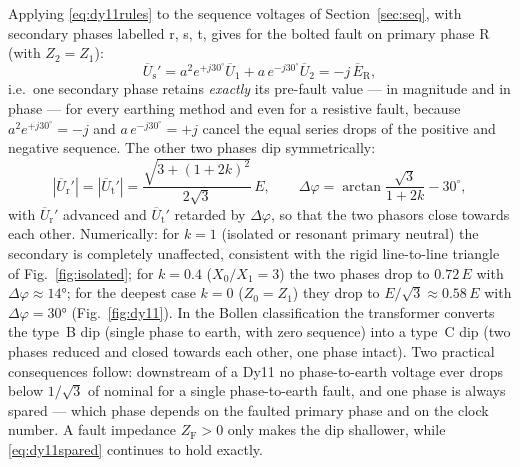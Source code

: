 \documentclass[a4paper,11pt]{article}
\newcommand{\ph}[1]{\mathrm{#1}}
\newcommand{\pE}[1]{\overline{E}_{\ph{#1}}}
\newcommand{\pU}[1]{\overline{U}_{\ph{#1}}}
\begin{document}
Applying \eqref{eq:dy11rules} to the sequence voltages of
Section~\ref{sec:seq}, with secondary phases labelled r, s, t, gives for the
bolted fault on primary phase R (with $Z_{2}=Z_{1}$):
\begin{equation}
\pU{s}' = a^{2}e^{+j30^{\circ}}\overline{U}_{1}
        + a\,e^{-j30^{\circ}}\overline{U}_{2}
        = -j\,\pE{R},
\label{eq:dy11spared}
\end{equation}
i.e.\ one secondary phase retains \emph{exactly} its pre-fault value --- in
magnitude and in phase --- for every earthing method and even for a resistive
fault, because $a^{2}e^{+j30^{\circ}} = -j$ and $a\,e^{-j30^{\circ}} = +j$
cancel the equal series drops of the positive and negative sequence. The
other two phases dip symmetrically:
\begin{equation}
|\pU{r}'| = |\pU{t}'| = \frac{\sqrt{3+(1+2k)^{2}}}{2\sqrt{3}}\,E,
\qquad
\Delta\varphi = \arctan\!\frac{\sqrt{3}}{1+2k} - 30^{\circ},
\label{eq:dy11depth}
\end{equation}
with $\pU{r}'$ advanced and $\pU{t}'$ retarded by $\Delta\varphi$, so that the
two phasors close towards each other. Numerically: for $k=1$ (isolated or
resonant primary neutral) the secondary is completely unaffected, consistent
with the rigid line-to-line triangle of Fig.~\ref{fig:isolated}; for $k=0.4$
($X_{0}/X_{1}=3$) the two phases drop to $0.72\,E$ with
$\Delta\varphi\approx\ang{14}$; for the deepest case $k=0$ ($Z_{0}=Z_{1}$)
they drop to $E/\sqrt{3}\approx 0.58\,E$ with $\Delta\varphi=\ang{30}$
(Fig.~\ref{fig:dy11}). In the Bollen classification the transformer converts
the type~B dip (single phase to earth, with zero sequence) into a type~C dip
(two phases reduced and closed towards each other, one phase intact). Two
practical consequences follow: downstream of a Dy11 no phase-to-earth voltage
ever drops below $1/\sqrt{3}$ of nominal for a single phase-to-earth fault,
and one phase is always spared --- which phase depends on the faulted primary
phase and on the clock number. A fault impedance $Z_\mathrm{F}>0$ only makes
the dip shallower, while \eqref{eq:dy11spared} continues to hold exactly.
\end{document}
